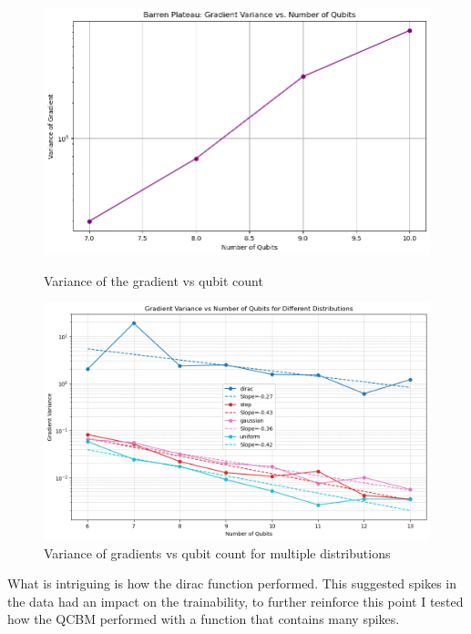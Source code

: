 \documentclass[12pt]{article}
\numberwithin{equation}{section}
\begin{document}
\begin{figure}[h!]
    \centering
    \begin{minipage}{0.48\textwidth}
        \centering
        \includegraphics[width=\linewidth]{gradvar.png}
        \caption{Variance of the gradient vs qubit count}
        \label{fig:gradvar}
    \end{minipage}
    \hfill
    \begin{minipage}{0.48\textwidth}
        \centering
        \includegraphics[width=\linewidth]{bpmultipledists.png}
        \caption{Variance of gradients vs qubit count for multiple distributions}
        \label{fig:bpmultiple}
    \end{minipage}
\end{figure}
What is intriguing is how the dirac function performed. This suggested spikes in 
the data had an impact on the trainability, to further reinforce this point I 
tested how the QCBM performed with a function that contains many spikes. 
\end{document}
